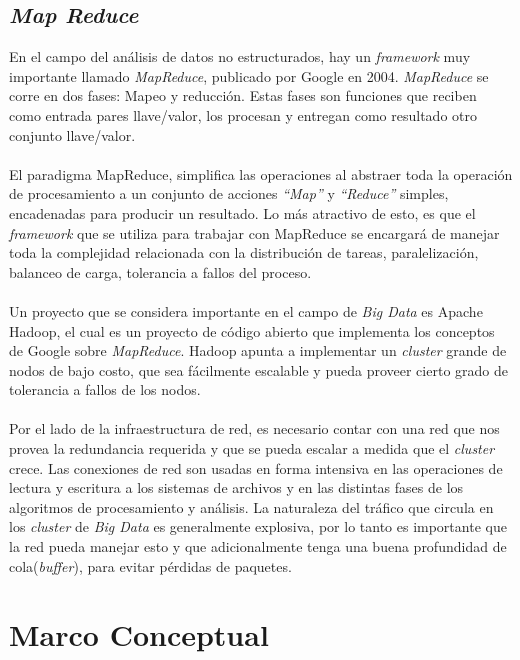 \subsection{\textit{Map Reduce}}
En el campo del an\'alisis de datos no estructurados, hay un \textit{framework} muy importante llamado \textit{MapReduce}, publicado por Google en 2004. \textit{MapReduce} se corre en dos fases: Mapeo y reducci\'on. Estas fases son funciones que reciben como entrada pares llave/valor, los procesan y entregan como resultado otro conjunto llave/valor.
\paragraph{}
El paradigma MapReduce, simplifica las operaciones al abstraer toda la operaci\'on de procesamiento a un conjunto de acciones \textit{“Map”} y \textit{“Reduce”} simples, encadenadas para producir un resultado. Lo m\'as atractivo de esto, es que el \textit{framework} que se utiliza para trabajar con MapReduce se encargar\'a de manejar toda la complejidad relacionada con la distribuci\'on de tareas, paralelizaci\'on, balanceo de carga, tolerancia a fallos del proceso.
\paragraph{}
Un proyecto que se considera importante en el campo de \textit{Big Data} es Apache Hadoop, el cual es un proyecto de c\'odigo abierto que implementa los conceptos de Google sobre \textit{MapReduce}. Hadoop apunta a implementar un \textit{cluster} grande de nodos de bajo costo, que sea f\'acilmente escalable y pueda proveer cierto grado de tolerancia a fallos de los nodos.
\paragraph{}
Por el lado de la infraestructura de red, es necesario contar con una red que nos provea la redundancia requerida y que se pueda escalar a medida que el \textit{cluster} crece. Las conexiones de red son usadas en forma intensiva en las operaciones de lectura y escritura a los sistemas de archivos y en las distintas fases de los algoritmos de procesamiento y an\'alisis. La naturaleza del tr\'afico que circula en los \textit{cluster} de \textit{Big Data} es generalmente explosiva, por lo tanto es importante que la red pueda manejar esto y que adicionalmente tenga una buena profundidad de cola(\textit{buffer}), para evitar p\'erdidas de paquetes.
\section{Marco Conceptual}
